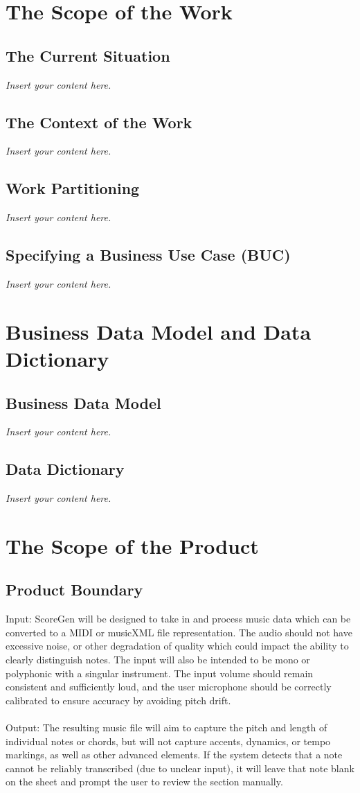 \documentclass[12pt]{article}
\newcommand{\lips}{\textit{Insert your content here.}}
\begin{document}
\section{The Scope of the Work}
\subsection{The Current Situation}
\lips
\subsection{The Context of the Work}
\lips
\subsection{Work Partitioning}
\lips
\subsection{Specifying a Business Use Case (BUC)}
\lips

\section{Business Data Model and Data Dictionary}
\subsection{Business Data Model}
\lips
\subsection{Data Dictionary}
\lips

\section{The Scope of the Product}
\subsection{Product Boundary}
Input: ScoreGen will be designed to take in and process music data which can be converted to a MIDI or musicXML file representation. The audio should not have excessive noise, or other degradation of quality which could impact the ability to clearly distinguish notes. The input will also be intended to be mono or polyphonic with a singular instrument. The input volume should remain consistent and sufficiently loud, and the user microphone should be correctly calibrated to ensure accuracy by avoiding pitch drift.
\\ \\
Output: The resulting music file will aim to capture the pitch and length of individual notes or chords, but will not capture accents, dynamics, or tempo markings, as well as other advanced elements. If the system detects that a note cannot be reliably transcribed (due to unclear input), it will leave that note blank on the sheet and prompt the user to review the section manually.
\end{document}
